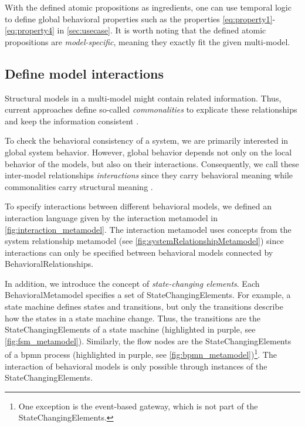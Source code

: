 \documentclass{jot}
\begin{document}
With the defined atomic propositions as ingredients, one can use temporal logic to define global behavioral properties such as the properties \eqref{eq:property1}-\eqref{eq:property4} in \autoref{sec:usecase}.
It is worth noting that the defined atomic propositions are \textit{model-specific}, meaning they exactly fit the given multi-model.

\subsection{Define model interactions}
Structural models in a multi-model might contain related information.
Thus, current approaches define so-called \emph{commonalities} to explicate these relationships and keep the information consistent \cite{stunkelComprehensiveSystemsFormal2021,klareCommonalitiesPreservingConsistency2019}.

To check the behavioral consistency of a system, we are primarily interested in global system behavior.
However, global behavior depends not only on the local behavior of the models, but also on their interactions.
Consequently, we call these inter-model relationships \emph{interactions} since they carry behavioral meaning while commonalities carry structural meaning \cite{krauterBehavioralConsistencyHeterogeneous2021}.

To specify interactions between different behavioral models, we defined an interaction language given by the interaction metamodel in \cref{fig:interaction_metamodel}.
The interaction metamodel uses concepts from the system relationship metamodel (see \cref{fig:systemRelationshipMetamodel}) since interactions can only be specified between behavioral models connected by \textsf{BehavioralRelationship}s.

In addition, we introduce the concept of \emph{state-changing elements}.
Each \textsf{BehavioralMetamodel} specifies a set of \textsf{StateChangingElement}s.
For example, a state machine defines states and transitions, but only the transitions describe how the states in a state machine change.
Thus, the transitions are the \textsf{StateChangingElement}s of a state machine (highlighted in purple, see \cref{fig:fsm_metamodel}).
Similarly, the flow nodes are the \textsf{StateChangingElement}s of a \gls*{bpmn} process (highlighted in purple, see \cref{fig:bpmn_metamodel})\footnote{One exception is the event-based gateway, which is not part of the \textsf{StateChangingElement}s.}.
The interaction of behavioral models is only possible through instances of the \textsf{StateChangingElement}s.
\end{document}
